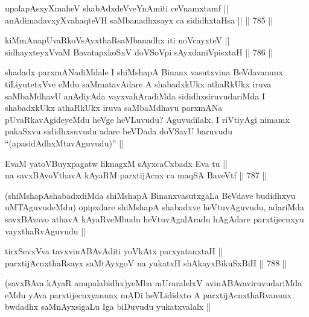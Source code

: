 \begin{shl}
upalapAsxyXmaheV shabAdxdeVveYnAmiti ceVnamxtamf || \\
anAdimadavxyXvahaqteVH saMbanadhxsayx ca sididhxtaHsa ||  ||  785 ||  
\end{shl}
				
\begin{shl}
kiMmAnapUvaRkoV\s sAyxthaRsaMbanadhx iti noVcayxteV || \\
sidhayxteyxVvaM BavatapxkoSxV doVSoV\s pi sAyxdaniVpisxtaH ||  786 ||  
\end{shl}

\begin{artha}
shadadx parxmANadiMdale I shiMshapA Binanx vasutxvina BeVdavanunx tiLiyutetxVve eMdu saMmatavAdare A shabadxkUkx athaRkUkx iruva saMbaMdhavU anAdiyAda vayxvahAradiMda sididhxsiruvudariMda I shabadxkUkx athaRkUkx iruva saMbaMdhavu parxmANa pUvaRkavAgideyeMdu heVge heVLuvudu? Aguvudilalx, I riVtiyAgi nimamx pakaSxvu sididhxsuvudu adare beVDada doVSavU baruvudu ``(apasidAdhxMtavAguvudu)'' ||
\end{artha}


\begin{shl}
EvaM yatoV\s Buyxpagatw liknagxM sAyxcaCxbadx Eva tu || \\
na savxBAvoV\s thavA kAyaRM parxtijAcnx ca maqSA BaveVtf ||  787 ||  
\end{shl}

\begin{artha}
(shiMshapAshabadxdiMda shiMshapA BinanxvasutxgaLa BeVdave budidhxyu uMTAguvudeMdu) opipxdare shiMshapA shabadxve heVtuvAguvudu, adariMda savxBAvavo athavA kAyaRveMbudu heVtuvAgalAradu hAgAdare parxtijecnxyu vayxthaRvAguvudu ||
\end{artha}

\begin{shl}
tirxSevxVva tavxvinABAvAditi yoVkAtx parxyatanxtaH || \\
parxtijAcnxthaRsayx saMtAyxgoV na yukatxH shAkayxBikuSxBiH ||  788 ||  
\end{shl}

\begin{artha}
(savxBAva kAyaR anupalabidhx)yeMba mUraralelxV avinABAvaviruvudariMda eMdu yAva parxtijecnxyanunx mADi heVLididxto A parxtijAcnxthaRvanunx bwdadhx saMnAyxsigaLu Iga biDuvudu yukatxvalalx ||
\end{artha}


